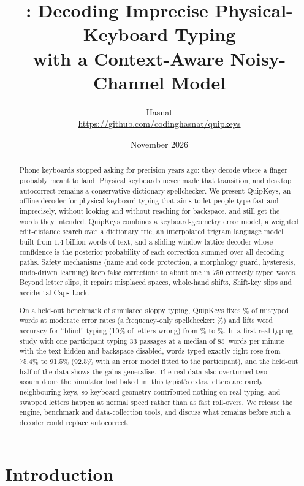 \documentclass[11pt,a4paper]{article}
\title{\qk: Decoding Imprecise Physical-Keyboard Typing\\with a Context-Aware Noisy-Channel Model}
\author{Hasnat\\[2pt]\small\url{https://github.com/codinghasnat/quipkeys}}
\date{November 2026}
\newcommand{\qk}{QuipKeys}
\begin{document}
\maketitle

\begin{abstract}
Phone keyboards stopped asking for precision years ago: they decode where a finger probably meant to land. Physical keyboards never made that transition, and desktop autocorrect remains a conservative dictionary spellchecker. We present \qk{}, an offline decoder for physical-keyboard typing that aims to let people type fast and imprecisely, without looking and without reaching for backspace, and still get the words they intended. \qk{} combines a keyboard-geometry error model, a weighted edit-distance search over a dictionary trie, an interpolated trigram language model built from 1.4 billion words of text, and a sliding-window lattice decoder whose confidence is the posterior probability of each correction summed over all decoding paths. Safety mechanisms (name and code protection, a morphology guard, hysteresis, undo-driven learning) keep false corrections to about one in 750 correctly typed words. Beyond letter slips, it repairs misplaced spaces, whole-hand shifts, Shift-key slips and accidental Caps Lock.

On a held-out benchmark of simulated sloppy typing, \qk{} fixes \ModFix\% of mistyped words at moderate error rates (a frequency-only spellchecker: \ModFixPlain\%) and lifts word accuracy for ``blind'' typing (10\% of letters wrong) from \BlindNone\% to \BlindAcc\%. In a first real-typing study with one participant typing 33 passages at a median of 85~words per minute with the text hidden and backspace disabled, words typed exactly right rose from 75.4\% to 91.5\% (92.5\% with an error model fitted to the participant), and the held-out half of the data shows the gains generalise. The real data also overturned two assumptions the simulator had baked in: this typist's extra letters are rarely neighbouring keys, so keyboard geometry contributed nothing on real typing, and swapped letters happen at normal speed rather than as fast roll-overs. We release the engine, benchmark and data-collection tools, and discuss what remains before such a decoder could replace autocorrect.
\end{abstract}

\section{Introduction}
\end{document}
